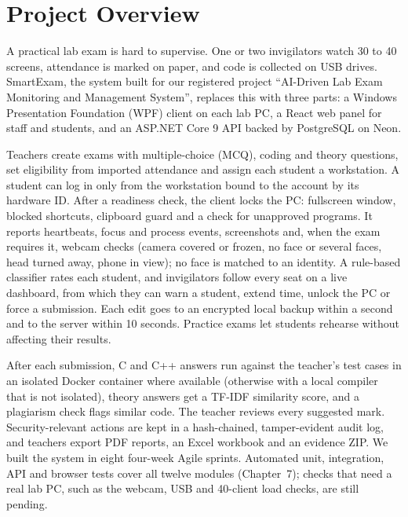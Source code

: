 \newpage
\thispagestyle{empty}
\chapter*{\centering Project Overview}

A practical lab exam is hard to supervise. One or two invigilators watch 30 to 40 screens, attendance is marked on paper, and code is collected on USB drives. SmartExam, the system built for our registered project ``AI-Driven Lab Exam Monitoring and Management System'', replaces this with three parts: a Windows Presentation Foundation (WPF) client on each lab PC, a React web panel for staff and students, and an ASP.NET Core 9 API backed by PostgreSQL on Neon.

Teachers create exams with multiple-choice (MCQ), coding and theory questions, set eligibility from imported attendance and assign each student a workstation. A student can log in only from the workstation bound to the account by its hardware ID. After a readiness check, the client locks the PC: fullscreen window, blocked shortcuts, clipboard guard and a check for unapproved programs. It reports heartbeats, focus and process events, screenshots and, when the exam requires it, webcam checks (camera covered or frozen, no face or several faces, head turned away, phone in view); no face is matched to an identity. A rule-based classifier rates each student, and invigilators follow every seat on a live dashboard, from which they can warn a student, extend time, unlock the PC or force a submission. Each edit goes to an encrypted local backup within a second and to the server within 10 seconds. Practice exams let students rehearse without affecting their results.

After each submission, C and C++ answers run against the teacher's test cases in an isolated Docker container where available (otherwise with a local compiler that is not isolated), theory answers get a TF-IDF similarity score, and a plagiarism check flags similar code. The teacher reviews every suggested mark. Security-relevant actions are kept in a hash-chained, tamper-evident audit log, and teachers export PDF reports, an Excel workbook and an evidence ZIP. We built the system in eight four-week Agile sprints. Automated unit, integration, API and browser tests cover all twelve modules (Chapter~7); checks that need a real lab PC, such as the webcam, USB and 40-client load checks, are still pending.
